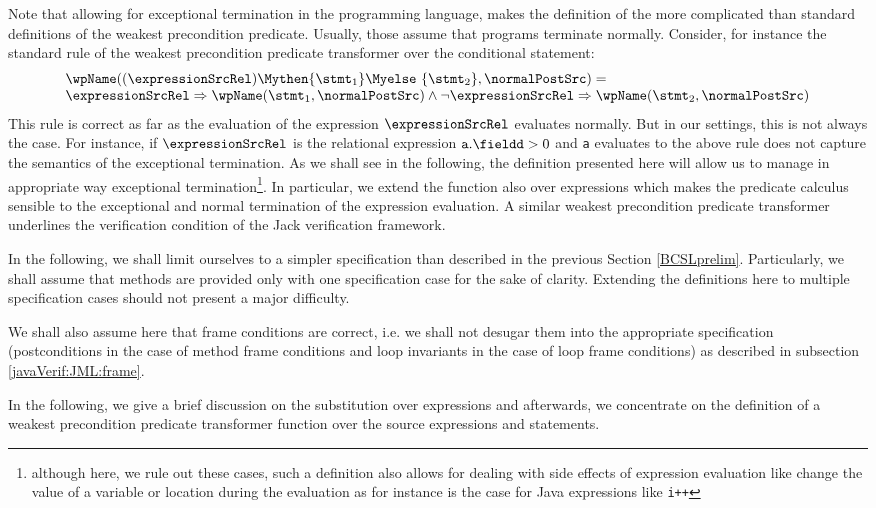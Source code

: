 Note that allowing for exceptional termination in the programming language,
 makes the definition of the \wpName{} more complicated  than standard definitions of the weakest precondition predicate. 
Usually, those assume that programs  terminate normally. 
Consider, for instance the standard rule of the weakest precondition predicate transformer over the conditional statement:
$$  \begin{array}{l}
\wpName((  \expressionSrcRel  )  \Mythen  \{ \stmt_1 \}   \Myelse \ \{ \stmt_2 \}, \normalPostSrc) = \\
  \expressionSrcRel \Rightarrow \wpName( \stmt_1, \normalPostSrc) \wedge
  \neg \expressionSrcRel \Rightarrow \wpName( \stmt_2, \normalPostSrc) \end{array}
$$
This rule is correct as far as the evaluation of the expression $\expressionSrcRel$ evaluates normally. But in our settings, this is not always the case.
For instance, if $ \expressionSrcRel$ is the relational expression $\mbox{\rm\texttt{a}}.\fieldd > 0$ and    \mbox{\rm\texttt{a}} evaluates to \Mynull{}
the above rule does not capture the semantics of the exceptional termination. As we shall see in the following, the definition presented here  will allow us to manage in  appropriate way
 exceptional termination\footnote{although here, we rule out these cases, such a definition also allows for dealing with side effects of expression evaluation like change
 the value of a variable or location during the evaluation as for instance is the case for Java expressions like \lstinline!i++!}.
 In particular, we extend the \wpName{} function also over expressions which makes the predicate calculus sensible to the exceptional and normal termination of the 
expression evaluation. A similar  weakest precondition predicate transformer underlines the verification condition of
 the Jack verification framework.


In the following, we shall limit ourselves to a simpler specification than described in the previous Section \ref{BCSLprelim}.
Particularly, we shall assume that  methods are provided only with one specification case for the sake of clarity.
 Extending the definitions here to multiple specification  cases should not present a major difficulty.

We shall also assume here that frame conditions are correct, i.e. we shall not desugar them  into the appropriate specification 
(postconditions in the  case of method frame conditions and loop invariants in the case of  loop frame conditions) as described in
subsection \ref{javaVerif:JML:frame}. 

In the following, we give a brief discussion on the substitution over expressions and afterwards, we concentrate
 on the definition of a weakest precondition predicate transformer function over the source expressions and statements.
